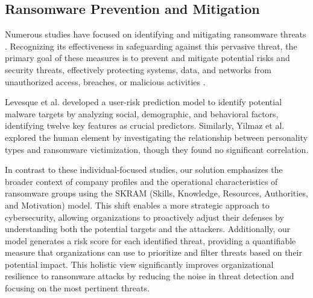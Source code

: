 \subsection{Ransomware Prevention and Mitigation}
Numerous studies have focused on identifying and mitigating ransomware threats \cite{McIntosh:2023,Oujezsky:2023,Thomas:2018,Chayal:2022, Kim2022}. Recognizing its effectiveness in safeguarding against this pervasive threat, the primary goal of these measures is to prevent and mitigate potential risks and security threats, effectively protecting systems, data, and networks from unauthorized access, breaches, or malicious activities \cite{Aldaraani:2018}.

Levesque et al. \cite{Levesque2014} developed a user-risk prediction model to identify potential malware targets by analyzing social, demographic, and behavioral factors, identifying twelve key features as crucial predictors. Similarly, Yilmaz et al. \cite{Yilmaz2023} explored the human element by investigating the relationship between personality types and ransomware victimization, though they found no significant correlation.

In contrast to these individual-focused studies, our solution emphasizes the broader context of company profiles and the operational characteristics of ransomware groups using the SKRAM (Skills, Knowledge, Resources, Authorities, and Motivation) model. This shift enables a more strategic approach to cybersecurity, allowing organizations to proactively adjust their defenses by understanding both the potential targets and the attackers. Additionally, our model generates a risk score for each identified threat, providing a quantifiable measure that organizations can use to prioritize and filter threats based on their potential impact. This holistic view significantly improves organizational resilience to ransomware attacks by reducing the noise in threat detection and focusing on the most pertinent threats.
